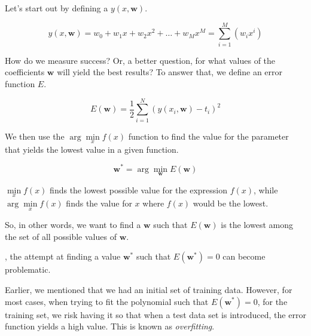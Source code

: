 \documentclass{tufte-handout}
\begin{document}
Let's start out by defining a $y(x, \mathbf{w})$.

\begin{equation}
  y(x, \mathbf{w}) = w_0 + w_1x + w_2x^2 + \ldots + w_Mx^M =
  \sum\limits_{i = 1}^M(w_ix^i)
\end{equation}

How do we measure success? Or, a better question, for what values of the
coefficients $\mathbf{w}$ will yield the best results? To answer that, we define
an error function $E$.

\begin{equation}
  E(\mathbf{w}) = \frac{1}{2}\sum\limits_{i = 1}^N(y(x_i, \mathbf{w}) - t_i)^2
\end{equation}

We then use the $\arg\min\limits_{x}f(x)$ function to find the value for the
parameter that yields the lowest value in a given function.

\begin{equation}
  \mathbf{w}^* = \arg \min\limits_{\mathbf{w}}E(\mathbf{w})
\end{equation}

$\min\limits_{x} f(x)$ finds the lowest possible value for the
expression $f(x)$, while $\arg\min\limits_{x} f(x)$ finds the value for $x$
where $f(x)$ would be the lowest.

So, in other words, we want to find a $\mathbf{w}$ such that $E(\mathbf{w})$ is
the lowest among the set of all possible values of $\mathbf{w}$.

, the attempt at finding a value $\mathbf{w}^*$ such that
$E(\mathbf{w}^*) = 0$ can become problematic.

Earlier, we mentioned that we had an initial set of training data. However, for
most cases, when trying to fit the polynomial such that $E(\mathbf{w}^*) = 0$,
for the training set, we risk having it so that when a test data set is
introduced, the error function yields a high value. This is known as
\textit{overfitting}.
\end{document}
